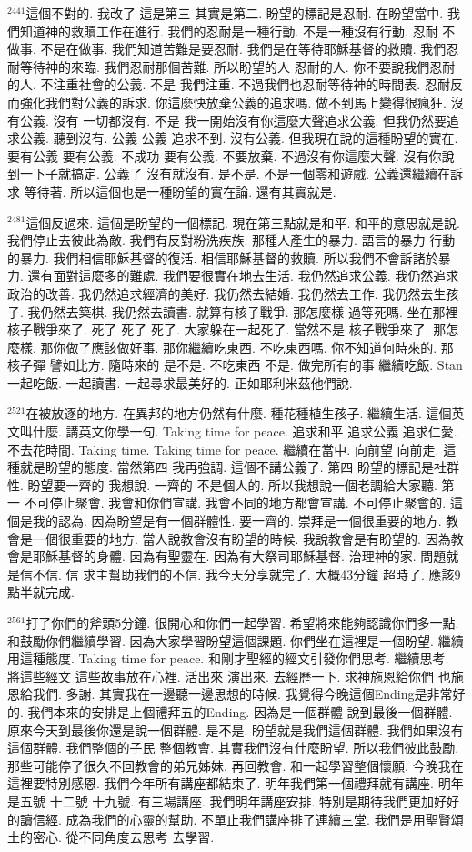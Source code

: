 \documentclass{book}
\begin{document}
$^{2441}$這個不對的.
我改了 這是第三 其實是第二.
盼望的標記是忍耐.
在盼望當中.
我們知道神的救贖工作在進行.
我們的忍耐是一種行動.
不是一種沒有行動.
忍耐 不做事.
不是在做事.
我們知道苦難是要忍耐.
我們是在等待耶穌基督的救贖.
我們忍耐等待神的來臨.
我們忍耐那個苦難.
所以盼望的人 忍耐的人.
你不要說我們忍耐的人.
不注重社會的公義.
不是 我們注重.
不過我們也忍耐等待神的時間表.
忍耐反而強化我們對公義的訴求.
你這麼快放棄公義的追求嗎.
做不到馬上變得很瘋狂.
沒有公義.
沒有 一切都沒有.
不是 我一開始沒有你這麼大聲追求公義.
但我仍然要追求公義.
聽到沒有.
公義 公義 追求不到.
沒有公義.
但我現在說的這種盼望的實在.
要有公義 要有公義.
不成功 要有公義.
不要放棄.
不過沒有你這麼大聲.
沒有你說到一下子就搞定.
公義了 沒有就沒有.
是不是.
不是一個零和遊戲.
公義還繼續在訴求 等待著.
所以這個也是一種盼望的實在論.
還有其實就是.

$^{2481}$這個反過來.
這個是盼望的一個標記.
現在第三點就是和平.
和平的意思就是說.
我們停止去彼此為敵.
我們有反對粉洗疾族.
那種人產生的暴力.
語言的暴力 行動的暴力.
我們相信耶穌基督的復活.
相信耶穌基督的救贖.
所以我們不會訴諸於暴力.
還有面對這麼多的難處.
我們要很實在地去生活.
我仍然追求公義.
我仍然追求政治的改善.
我仍然追求經濟的美好.
我仍然去結婚.
我仍然去工作.
我仍然去生孩子.
我仍然去築棋.
我仍然去讀書.
就算有核子戰爭.
那怎麼樣 過等死嗎.
坐在那裡 核子戰爭來了.
死了 死了 死了.
大家躲在一起死了.
當然不是 核子戰爭來了.
那怎麼樣.
那你做了應該做好事.
那你繼續吃東西.
不吃東西嗎.
你不知道何時來的.
那核子彈 譬如比方.
隨時來的 是不是.
不吃東西 不是.
做完所有的事 繼續吃飯.
Stan 一起吃飯.
一起讀書.
一起尋求最美好的.
正如耶利米茲他們說.

$^{2521}$在被放逐的地方.
在異邦的地方仍然有什麼.
種花種植生孩子.
繼續生活.
這個英文叫什麼.
講英文你學一句.
Taking time for peace.
追求和平 追求公義 追求仁愛.
不去花時間.
Taking time.
Taking time for peace.
繼續在當中.
向前望 向前走.
這種就是盼望的態度.
當然第四 我再強調.
這個不講公義了.
第四 盼望的標記是社群性.
盼望要一齊的 我想說.
一齊的 不是個人的.
所以我想說一個老調給大家聽.
第一 不可停止聚會.
我會和你們宣講.
我會不同的地方都會宣講.
不可停止聚會的.
這個是我的認為.
因為盼望是有一個群體性.
要一齊的.
崇拜是一個很重要的地方.
教會是一個很重要的地方.
當人說教會沒有盼望的時候.
我說教會是有盼望的.
因為教會是耶穌基督的身體.
因為有聖靈在.
因為有大祭司耶穌基督.
治理神的家.
問題就是信不信.
信 求主幫助我們的不信.
我今天分享就完了.
大概43分鐘 超時了.
應該9點半就完成.

$^{2561}$打了你們的斧頭5分鐘.
很開心和你們一起學習.
希望將來能夠認識你們多一點.
和鼓勵你們繼續學習.
因為大家學習盼望這個課題.
你們坐在這裡是一個盼望.
繼續用這種態度.
Taking time for peace.
和剛才聖經的經文引發你們思考.
繼續思考.
將這些經文 這些故事放在心裡.
活出來 演出來.
去經歷一下.
求神施恩給你們 也施恩給我們.
多謝.
其實我在一邊聽一邊思想的時候.
我覺得今晚這個Ending是非常好的.
我們本來的安排是上個禮拜五的Ending.
因為是一個群體 說到最後一個群體.
原來今天到最後你還是說一個群體.
是不是.
盼望就是我們這個群體.
我們如果沒有這個群體.
我們整個的子民 整個教會.
其實我們沒有什麼盼望.
所以我們彼此鼓勵.
那些可能停了很久不回教會的弟兄姊妹.
再回教會.
和一起學習整個懷願.
今晚我在這裡要特別感恩.
我們今年所有講座都結束了.
明年我們第一個禮拜就有講座.
明年是五號 十二號 十九號.
有三場講座.
我們明年講座安排.
特別是期待我們更加好好的讀信經.
成為我們的心靈的幫助.
不單止我們講座排了連續三堂.
我們是用聖賢頌土的密心.
從不同角度去思考 去學習.
\end{document}
